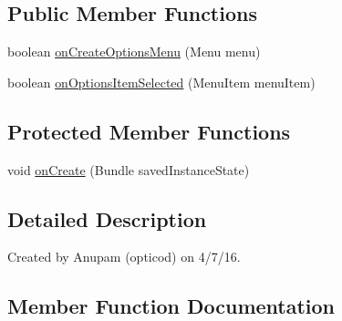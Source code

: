 \subsection*{Public Member Functions}
\begin{DoxyCompactItemize}
\item 
boolean \hyperlink{classorg_1_1buildmlearn_1_1dictation_1_1activities_1_1DetailActivity_ad321009da1fd165f1ef674c24ad21797}{on\+Create\+Options\+Menu} (Menu menu)
\item 
boolean \hyperlink{classorg_1_1buildmlearn_1_1dictation_1_1activities_1_1DetailActivity_aab5826804ae41013c99958c46b2d56f2}{on\+Options\+Item\+Selected} (Menu\+Item menu\+Item)
\end{DoxyCompactItemize}
\subsection*{Protected Member Functions}
\begin{DoxyCompactItemize}
\item 
void \hyperlink{classorg_1_1buildmlearn_1_1dictation_1_1activities_1_1DetailActivity_a4c1bbaf2e2779076092e1a333791f15f}{on\+Create} (Bundle saved\+Instance\+State)
\end{DoxyCompactItemize}


\subsection{Detailed Description}
Created by Anupam (opticod) on 4/7/16. 

\subsection{Member Function Documentation}

